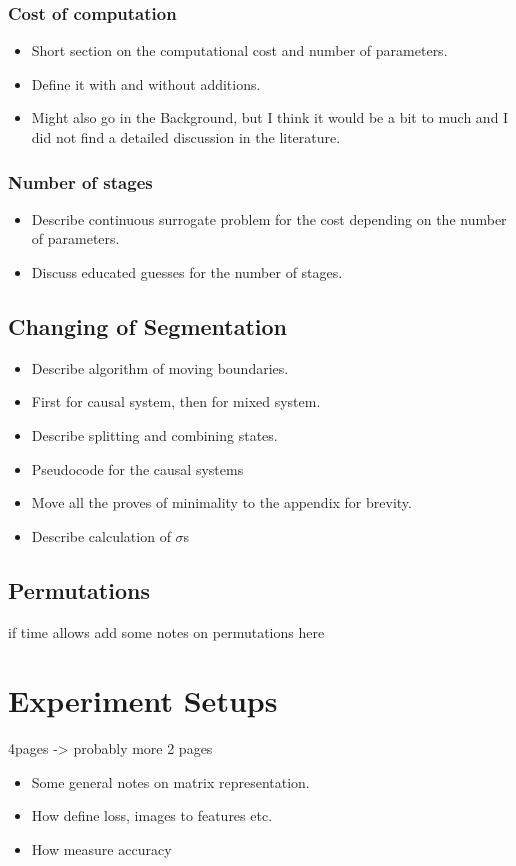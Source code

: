 \documentclass[doctype=mastersthesis,BCOR=15mm,biblatex]{ldvbook}%
\begin{document}
\subsection{Cost of computation}
\begin{itemize}
\item Short section on the computational cost and number of parameters.

\item Define it with and without additions.

\item Might also go in the Background, but I think it would be a bit to much and I did not find a detailed discussion in the literature. 
\end{itemize}
\subsection{Number of stages}
\begin{itemize}
\item Describe continuous surrogate problem for the cost depending on the number of parameters. 
\item Discuss educated guesses for the number of stages.
\end{itemize}

\section{Changing of Segmentation}
\begin{itemize}
\item Describe algorithm of moving boundaries.
\item First for causal system, then for mixed system.

\item Describe splitting and combining states.

\item Pseudocode for the causal systems

\item Move all the proves of minimality to the appendix for brevity.
\item Describe calculation of $\sigma$s
\end{itemize}
\section{Permutations}
if time allows add some notes on permutations here


\chapter{Experiment Setups}
4pages -> probably more 2 pages
\begin{itemize}
\item Some general notes on matrix representation.

\item How define loss, images to features etc. 
\item How measure accuracy
\end{itemize}
\end{document}
